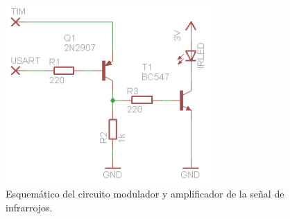 \begin{figure}[!ht]
	\centering
	\includegraphics[width=0.7\textwidth]{images/comunicacion-IRsch}
	\caption{Esquemático del circuito modulador y amplificador de
	la señal de infrarrojos.}
	\label{fig:comunicacion-IRsch}
\end{figure}
